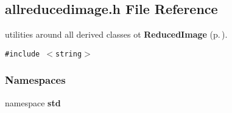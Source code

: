\subsection{allreducedimage.h File Reference}
\label{allreducedimage_h}
utilities around all derived classes ot {\bf Reduced\-Image} {\rm (p.\,\pageref{class_reducedimage})}. 


{\tt \#include $<$string$>$}\par
\subsubsection*{Namespaces}
\begin{CompactItemize}
\item 
namespace {\bf std}
\end{CompactItemize}
